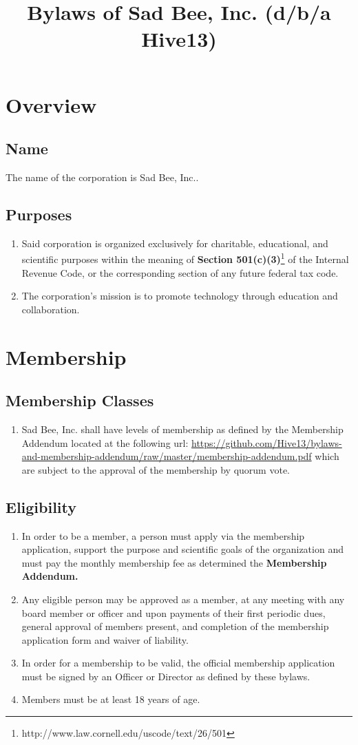 \documentclass{article}
\title{Bylaws of Sad Bee, Inc. (d/b/a Hive13)}
\begin{document}
\maketitle
\section{Overview}
\subsection{Name}
The name of the corporation is Sad Bee, Inc..
\subsection{Purposes}
\begin{enumerate}
    \item Said corporation is organized exclusively for charitable, educational,
and scientific purposes within the meaning of \textbf{Section 501(c)(3)}\footnote{http://www.law.cornell.edu/uscode/text/26/501} of the Internal
Revenue Code, or the corresponding section of any future federal tax code.
    \item The corporation's mission is to promote technology through education and 
collaboration.
\end{enumerate}
\section{Membership}
\subsection{Membership Classes}
\begin{enumerate}
    \item Sad Bee, Inc. shall have levels of membership as defined by the
      Membership Addendum located at the following url: \url{https://github.com/Hive13/bylaws-and-membership-addendum/raw/master/membership-addendum.pdf} which are
    subject to the approval of the membership by quorum vote.
\end{enumerate}
\subsection{Eligibility}
\begin{enumerate}
    \item In order to be a member, a person must apply via the membership
    application, support the purpose and scientific goals of the organization
    and must pay the monthly membership fee as determined the \textbf{Membership Addendum.}
    \item Any eligible person may be approved as a member, at any meeting with
    any board member or officer and upon payments of their first periodic dues,
    general approval of members present, and completion of the membership
    application form and waiver of liability.
    \item In order for a membership to be valid, the official membership
    application must be signed by an Officer or Director as defined by these
    bylaws.
    \item Members must be at least 18 years of age.
\end{enumerate}
\end{document}
